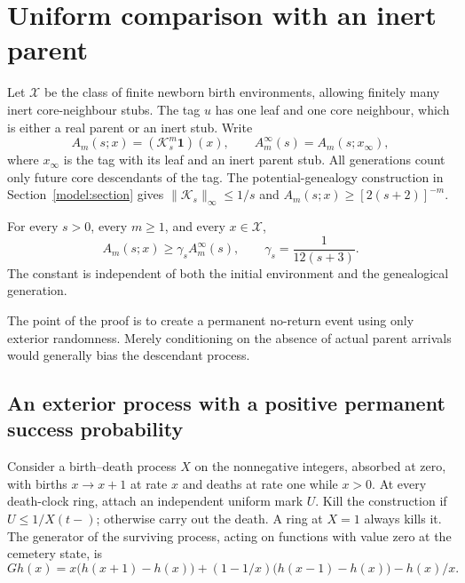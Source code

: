 \section{Uniform comparison with an inert parent}

Let $\mathcal X$ be the class of finite newborn birth environments,
allowing finitely many inert core-neighbour stubs. The tag $u$ has one
leaf and one core neighbour, which is either a real parent or an inert
stub. Write
\[
 A_m(s;x)=(\mathcal K_s^m\mathbf1)(x),\qquad
 A_m^\infty(s)=A_m(s;x_\infty),
\]
where $x_\infty$ is the tag with its leaf and an inert parent stub.
All generations count only future core descendants of the tag.
The potential-genealogy construction in Section~\ref{model:section} gives
$\|\mathcal K_s\|_\infty\le1/s$ and
$A_m(s;x)\ge[2(s+2)]^{-m}$.

\begin{theorem}\label{growth:minorization}
For every $s>0$, every $m\ge1$, and every $x\in\mathcal X$,
\begin{equation}\label{growth:comparison}
 \boxed{
 A_m(s;x)\ge\gamma_s A_m^\infty(s),
 \qquad \gamma_s=\frac1{12(s+3)}.
 }
\end{equation}
The constant is independent of both the initial environment and the
genealogical generation.
\end{theorem}

The point of the proof is to create a permanent no-return event using
only exterior randomness. Merely conditioning on the absence of actual
parent arrivals would generally bias the descendant process.

\subsection{An exterior process with a positive permanent success probability}

Consider a birth--death process $X$ on the nonnegative integers,
absorbed at zero, with births $x\to x+1$ at rate $x$ and deaths at
rate one while $x>0$. At every death-clock ring, attach an independent
uniform mark $U$. Kill the construction if $U\le1/X(t-)$; otherwise
carry out the death. A ring at $X=1$ always kills it. The generator of
the surviving process, acting on functions with value zero at the
cemetery state, is
\begin{equation}\label{growth:killed-generator}
 Gh(x)=x\bigl(h(x+1)-h(x)\bigr)
 +(1-1/x)\bigl(h(x-1)-h(x)\bigr)-h(x)/x.
\end{equation}

